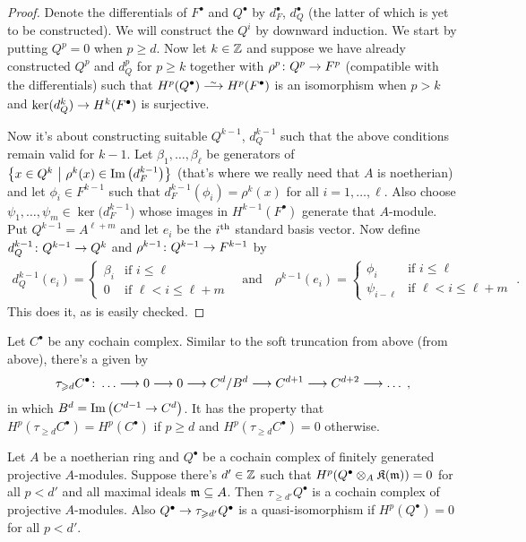 \documentclass[a4paper,parskip=half,numbers=enddot, DIV=12]{scrreprt}
\renewcommand{\geq}{\geqslant}
\renewcommand{\leq}{\leqslant}
\begin{document}
\begin{proof}
	Denote the differentials of $F^\bullet$ and $Q^\bullet$ by $d_F^\bullet$, $d_Q^\bullet$ (the latter of which is yet to be constructed). We will construct the $Q^i$ by downward induction. We start by putting $Q^p=0$ when $p\geq d$. Now let $k\in\mathbb{Z}$ and suppose we have already constructed $Q^p$ and $d_Q^p$ for $p\geq k$ together with $\rho^p\colon Q^p\morphism F^p$ (compatible with the differentials) such that $H^p(Q^\bullet)\isomorphism H^p(F^\bullet)$ is an isomorphism when $p>k$ and $\ker(d_Q^k)\morphism H^k(F^\bullet)$ is surjective.
	
Now it's about constructing suitable $Q^{k-1}$, $d_Q^{k-1}$ such that the above conditions remain valid for $k-1$. Let $\beta_1,\ldots,\beta_\ell$ be generators of $\left\{x\in Q^k\ \middle|\  \rho^k(x)\in\operatorname{Im}\big(d_F^{k-1}\big)\right\}$
(that's where we really need that $A$ is noetherian) and let $\phi_i\in F^{k-1}$ such that $d_F^{k-1}(\phi_i)=\rho^k(x)$ for all $i=1,\ldots,\ell$. Also choose $\psi_1,\ldots,\psi_m\in\ker\big(d_F^{k-1}\big)$ whose images in $H^{k-1}(F^\bullet)$ generate that $A$-module. Put $Q^{k-1}=A^{\ell+m}$ and let $e_i$ be the $i^{\text{th}}$ standard basis vector. Now define $d_Q^{k-1}\colon Q^{k-1}\morphism Q^k$ and $\rho^{k-1}\colon Q^{k-1}\morphism F^{k-1}$ by
\begin{align*}
	d_Q^{k-1}(e_i)=
	\begin{cases}
		\beta_i &\text{if }i\leq \ell\\
		0 & \text{if }\ell <i\leq \ell+m
	\end{cases}\quad\text{and}\quad\rho^{k-1}(e_i)=
	\begin{cases}
		\phi_i & \text{if }i\leq \ell\\
		\psi_{i-\ell} & \text{if }\ell <i\leq \ell+m
	\end{cases}\;.
\end{align*}
This does it, as is easily checked.
\end{proof}
Let $C^\bullet$ be any cochain complex. Similar to the soft truncation from above (from above), there's a  given by
\begin{align*}
\tau_{\geq d}C^\bullet\colon\ldots\morphism 0\morphism 0\morphism C^d/B^d\morphism C^{d+1}\morphism C^{d+2}\morphism \ldots\;,
\end{align*}
in which $B^d=\Im\left(C^{d-1}\morphism C^d\right)$. It has the property that $H^p(\tau_{\geq d}C^\bullet)=H^p(C^\bullet)$ if $p\geq d$ and $H^p(\tau_{\geq d}C^\bullet)=0$ otherwise.
\begin{lem}
	Let $A$ be a noetherian ring and $Q^\bullet$ be a cochain complex of finitely generated projective $A$-modules. Suppose there's $d'\in\mathbb{Z}$ such that $H^p(Q^\bullet\otimes_A\mathfrak{K}(\mathfrak{m}))=0$ for all $p<d'$ and all maximal ideals $\mathfrak{m}\subseteq A$. Then $\tau_{\geq d'}Q^\bullet$ is a cochain complex of projective $A$-modules. Also $Q^\bullet\morphism \tau_{\geq d'}Q^\bullet$ is a quasi-isomorphism if $H^p(Q^\bullet)=0$ for all $p< d'$.
\end{lem}
\end{document}

